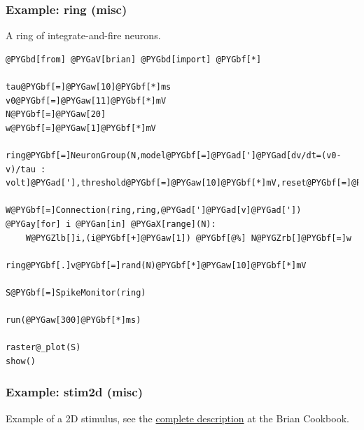 \documentclass[letterpaper,10pt,english]{manual}
\begin{document}
\hypertarget{index-83}{}\subsubsection{Example: ring (misc)}

A ring of integrate-and-fire neurons.

\begin{Verbatim}[commandchars=@\[\]]
@PYGbd[from] @PYGaV[brian] @PYGbd[import] @PYGbf[*]

tau@PYGbf[=]@PYGaw[10]@PYGbf[*]ms
v0@PYGbf[=]@PYGaw[11]@PYGbf[*]mV
N@PYGbf[=]@PYGaw[20]
w@PYGbf[=]@PYGaw[1]@PYGbf[*]mV

ring@PYGbf[=]NeuronGroup(N,model@PYGbf[=]@PYGad[']@PYGad[dv/dt=(v0-v)/tau : volt]@PYGad['],threshold@PYGbf[=]@PYGaw[10]@PYGbf[*]mV,reset@PYGbf[=]@PYGaw[0]@PYGbf[*]mV)

W@PYGbf[=]Connection(ring,ring,@PYGad[']@PYGad[v]@PYGad['])
@PYGay[for] i @PYGan[in] @PYGaX[range](N):
    W@PYGZlb[]i,(i@PYGbf[+]@PYGaw[1]) @PYGbf[@%] N@PYGZrb[]@PYGbf[=]w

ring@PYGbf[.]v@PYGbf[=]rand(N)@PYGbf[*]@PYGaw[10]@PYGbf[*]mV

S@PYGbf[=]SpikeMonitor(ring)

run(@PYGaw[300]@PYGbf[*]ms)

raster@_plot(S)
show()
\end{Verbatim}

\resetcurrentobjects
\hypertarget{--doc-examples-misc_stim2d}{}

\hypertarget{index-84}{}\subsubsection{Example: stim2d (misc)}

Example of a 2D stimulus, see the
\href{http://neuralensemble.org/cookbook/wiki/Brian/StimulusArrayGroup}{complete description}
at the Brian Cookbook.
\end{document}
